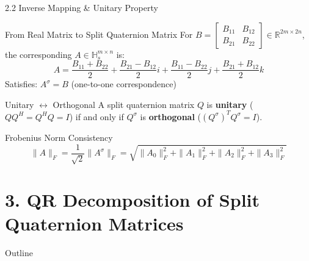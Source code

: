 \documentclass{beamer}
\begin{document}
\begin{frame}{2.2 Inverse Mapping \& Unitary Property}
  \begin{block}{From Real Matrix to Split Quaternion Matrix}
    For $B = \begin{bmatrix} B_{11} & B_{12} \\ B_{21} & B_{22} \end{bmatrix} \in \mathbb{R}^{2m \times 2n}$, the corresponding $A \in \mathbb{H}_s^{m \times n}$ is:
    \[
    A = \frac{B_{11}+B_{22}}{2} + \frac{B_{21}-B_{12}}{2}i + \frac{B_{11}-B_{22}}{2}j + \frac{B_{21}+B_{12}}{2}k
    \]
    Satisfies: $A^\sigma = B$ (one-to-one correspondence)
  \end{block}
  
  \begin{block}{Unitary $\leftrightarrow$ Orthogonal}
    A split quaternion matrix $Q$ is \textbf{unitary} ($QQ^H = Q^HQ = I$) if and only if $Q^\sigma$ is \textbf{orthogonal} ($(Q^\sigma)^T Q^\sigma = I$).
  \end{block}
  
  \begin{block}{Frobenius Norm Consistency}
    \[
    \|A\|_F = \frac{1}{\sqrt{2}}\|A^\sigma\|_F = \sqrt{\|A_0\|_F^2 + \|A_1\|_F^2 + \|A_2\|_F^2 + \|A_3\|_F^2}
    \]
  \end{block}
\end{frame}

\section{3. QR Decomposition of Split Quaternion Matrices}
\begin{frame}{Outline}
  \tableofcontents[sectionstyle=show/shaded, subsectionstyle=show/show/shaded]
\end{frame}
\end{document}
